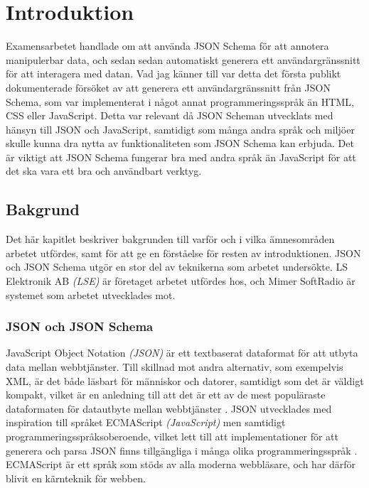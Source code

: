 \chapter{Introduktion}

Examensarbetet handlade om att använda JSON Schema för att annotera manipulerbar data, och sedan sedan automatiskt generera ett användargränssnitt för att interagera med datan. Vad jag känner till var detta det första publikt dokumenterade försöket av att generera ett användargränssnitt från JSON Schema, som var implementerat i något annat programmeringsspråk än HTML, CSS eller JavaScript. Detta var relevant då JSON Scheman utvecklats med hänsyn till JSON och JavaScript, samtidigt som många andra språk och miljöer skulle kunna dra nytta av funktionaliteten som JSON Schema kan erbjuda. Det är viktigt att JSON Schema fungerar bra med andra språk än JavaScript för att det ska vara ett bra och användbart verktyg.

\section{Bakgrund}
\label{sec:intro:bakgrund}
Det här kapitlet beskriver bakgrunden till varför och i vilka ämnesområden arbetet utfördes, samt för att ge en förståelse för resten av introduktionen. JSON och JSON Schema utgör en stor del av teknikerna som arbetet undersökte. LS Elektronik AB \textit{(LSE)} är företaget arbetet utfördes hos, och Mimer SoftRadio är systemet som arbetet utvecklades mot.

\subsection{JSON och JSON Schema}
\label{sec:intro:json}
JavaScript Object Notation \textit{(JSON)} är ett textbaserat dataformat för att utbyta data mellan webbtjänster. Till skillnad mot andra alternativ, som exempelvis XML, är det både läsbart för människor och datorer, samtidigt som det är väldigt kompakt, vilket är en anledning till att det är ett av de mest populäraste dataformaten för datautbyte mellan webbtjänster \cite{Pezoa2016}. JSON utvecklades med inspiration till språket ECMAScript \textit{(JavaScript)} men samtidigt programmeringsspråksoberoende, vilket lett till att implementationer för att generera och parsa JSON finns tillgängliga i många olika programmeringsspråk \cite{ECMA2013}. ECMAScript är ett språk som stöds av alla moderna webbläsare, och har därför blivit en kärnteknik för webben.


